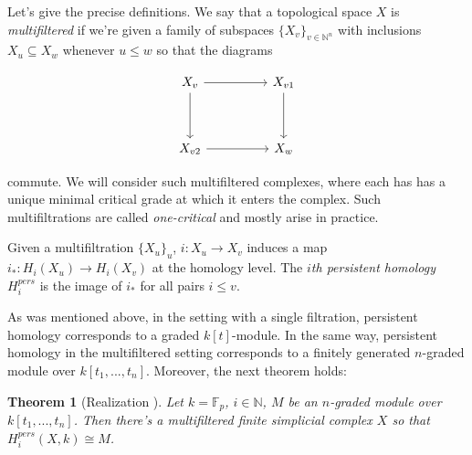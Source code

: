 \documentclass[a4paper,8pt,epsfig]{article}
\newtheorem{theorem}{Theorem}
\begin{document}
	 
	 Let's give the precise definitions. We say that a topological space $X$ is {\it multifiltered} if we're given a family of subspaces $\{X_v\}_{v \in \mathbb{N}^n}$ with inclusions $X_u \subseteq X_w$ whenever $u \leq w$ so that the diagrams 
	 
	 \[\begin{tikzcd}
	 {X_v} && {X_{v1}} \\
	 \\
	 {X_{v2}} && {X_w}
	 \arrow[from=1-1, to=1-3]
	 \arrow[from=1-1, to=3-1]
	 \arrow[from=3-1, to=3-3]
	 \arrow[from=1-3, to=3-3]
	 \end{tikzcd}\]
	 
	 commute. We will consider such multifiltered complexes, where each has has a unique minimal critical grade at which it enters the complex. Such multifiltrations are called {\it one-critical} and mostly arise in practice.
	 
	 \iffalse
	 Given a simplicial complex $K$, we may define {\it chain groups} $C_i$ as the free abelian groups on oriented $i$-simplices. We may provide the {\it boundary operator} $ \delta_i C_i \to C_{i-1}$, that connects the chain groups into a {\it chain complex} $C_\bullet$:
	 \[
	 	... \to C_{i+1} \to C_i \to C_{i-1} \to ... .
	 \]
	 And for any chain complex, we may define the {\it $i$th homology group} $H_i$:
	 \[
	 	H_i(C_\bullet) \coloneqq \frac{\mathrm{ker }\; \delta_i}{\mathrm{im }\; \delta_{i+1}}.
	 \]
	 \fi
	 
	 Given a multifiltration $\{ X_u \}_u$, $i: X_u \to X_v$ induces a map $i_*: H_i(X_u) \to H_i(X_v)$ at the homology level. The {\it $i$th persistent homology} $H_i^{pers}$  is the image of $i_*$ for all pairs $i \leq v$.
	 
	 As was mentioned above, in the setting with a single filtration, persistent homology corresponds to a graded $k[t]$-module. In the same way, persistent homology in the multifiltered setting corresponds to a finitely generated $n$-graded module over $k[t_1, ..., t_n]$. Moreover, the next theorem holds:
	 
	 \begin{theorem}[Realization \cite{theormulpers}]
	 	Let $k = \mathbb{F}_p$, $i \in \mathbb{N}$, $M$ be an $n$-graded module over $k[t_1, ..., t_n]$. Then there's a multifiltered finite simplicial complex $X$ so that $H_i^{pers}(X, k) \cong M$.
	 \end{theorem}
 
\end{document}
